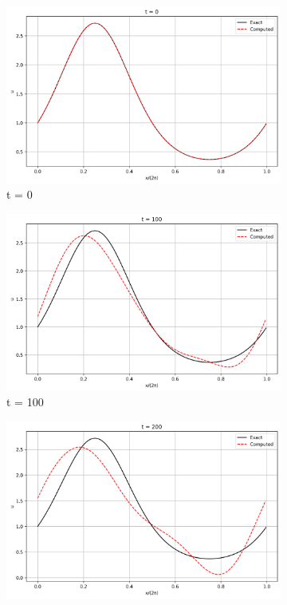\documentclass{article}
\begin{document}
\begin{figure}[htbp]
    \centering
    \begin{subfigure}[b]{0.32\textwidth}
        \includegraphics[width=\textwidth]{figures/long_time_second_order_0.png}
        \caption{t = 0}
    \end{subfigure}
    \begin{subfigure}[b]{0.32\textwidth}
        \includegraphics[width=\textwidth]{figures/long_time_second_order_100.png}
        \caption{t = 100}
    \end{subfigure}
    \begin{subfigure}[b]{0.32\textwidth}
        \includegraphics[width=\textwidth]{figures/long_time_second_order_200.png}

\end{subfigure}
\end{figure}
\end{document}
